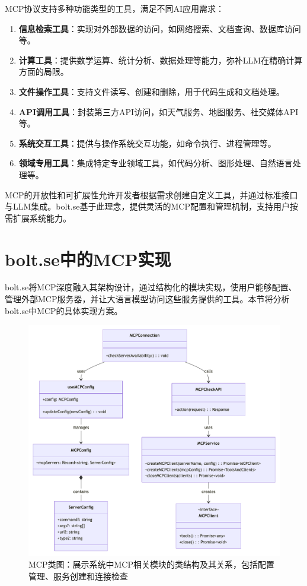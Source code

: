 MCP协议支持多种功能类型的工具，满足不同AI应用需求：

\begin{enumerate}
  \item \textbf{信息检索工具}：实现对外部数据的访问，如网络搜索、文档查询、数据库访问等。
  
  \item \textbf{计算工具}：提供数学运算、统计分析、数据处理等能力，弥补LLM在精确计算方面的局限。
  
  \item \textbf{文件操作工具}：支持文件读写、创建和删除，用于代码生成和文档处理。
  
  \item \textbf{API调用工具}：封装第三方API访问，如天气服务、地图服务、社交媒体API等。
  
  \item \textbf{系统交互工具}：提供与操作系统交互功能，如命令执行、进程管理等。
  
  \item \textbf{领域专用工具}：集成特定专业领域工具，如代码分析、图形处理、自然语言处理等。
\end{enumerate}

MCP的开放性和可扩展性允许开发者根据需求创建自定义工具，并通过标准接口与LLM集成。bolt.se基于此理念，提供灵活的MCP配置和管理机制，支持用户按需扩展系统能力。

\section{bolt.se中的MCP实现}

bolt.se将MCP深度融入其架构设计，通过结构化的模块实现，使用户能够配置、管理外部MCP服务器，并让大语言模型访问这些服务提供的工具。本节将分析bolt.se中MCP的具体实现方案。

\begin{figure}[htbp]
  \centering
  \includegraphics[width=\textwidth]{figures/mcp_class.pdf}
  \caption{MCP类图：展示系统中MCP相关模块的类结构及其关系，包括配置管理、服务创建和连接检查}
  \label{fig:mcp_class}
\end{figure}

